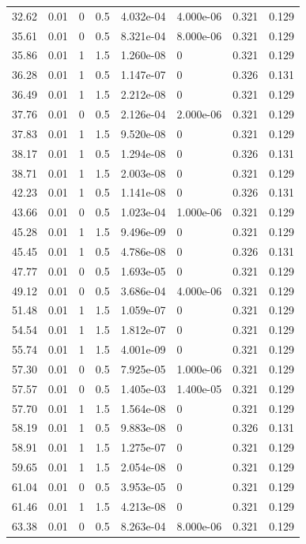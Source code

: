 \documentclass[preview]{standalone}
\begin{document}
{{\begin{tabular}{L{1.2cm}C{1.2cm} C{0.3cm}C{0.5cm} C{1.4cm}C{1.4cm} C{1.4cm}C{1.4cm}}
  32.62  &  0.01  & 0     & 0.5 &  4.032e-04  & 4.000e-06  & 0.321 &  0.129   \\ 
  35.61  &  0.01  & 0     & 0.5 &  8.321e-04  & 8.000e-06  & 0.321 &  0.129   \\ 
  35.86  &  0.01  & 1     & 1.5 &  1.260e-08  & 0  & 0.321 &  0.129   \\ 
  36.28  &  0.01  & 1     & 0.5 &  1.147e-07  & 0  & 0.326 &  0.131   \\ 
  36.49  &  0.01  & 1     & 1.5 &  2.212e-08  & 0  & 0.321 &  0.129   \\ 
  37.76  &  0.01  & 0     & 0.5 &  2.126e-04  & 2.000e-06  & 0.321 &  0.129   \\ 
  37.83  &  0.01  & 1     & 1.5 &  9.520e-08  & 0  & 0.321 &  0.129   \\ 
  38.17  &  0.01  & 1     & 0.5 &  1.294e-08  & 0  & 0.326 &  0.131   \\ 
  38.71  &  0.01  & 1     & 1.5 &  2.003e-08  & 0  & 0.321 &  0.129   \\ 
  42.23  &  0.01  & 1     & 0.5 &  1.141e-08  & 0  & 0.326 &  0.131   \\ 
  43.66  &  0.01  & 0     & 0.5 &  1.023e-04  & 1.000e-06  & 0.321 &  0.129   \\ 
  45.28  &  0.01  & 1     & 1.5 &  9.496e-09  & 0  & 0.321 &  0.129   \\ 
  45.45  &  0.01  & 1     & 0.5 &  4.786e-08  & 0  & 0.326 &  0.131   \\ 
  47.77  &  0.01  & 0     & 0.5 &  1.693e-05  & 0  & 0.321 &  0.129   \\ 
  49.12  &  0.01  & 0     & 0.5 &  3.686e-04  & 4.000e-06  & 0.321 &  0.129   \\ 
  51.48  &  0.01  & 1     & 1.5 &  1.059e-07  & 0  & 0.321 &  0.129   \\ 
  54.54  &  0.01  & 1     & 1.5 &  1.812e-07  & 0  & 0.321 &  0.129   \\ 
  55.74  &  0.01  & 1     & 1.5 &  4.001e-09  & 0  & 0.321 &  0.129   \\ 
  57.30  &  0.01  & 0     & 0.5 &  7.925e-05  & 1.000e-06  & 0.321 &  0.129   \\ 
  57.57  &  0.01  & 0     & 0.5 &  1.405e-03  & 1.400e-05  & 0.321 &  0.129   \\ 
  57.70  &  0.01  & 1     & 1.5 &  1.564e-08  & 0  & 0.321 &  0.129   \\ 
  58.19  &  0.01  & 1     & 0.5 &  9.883e-08  & 0  & 0.326 &  0.131   \\ 
  58.91  &  0.01  & 1     & 1.5 &  1.275e-07  & 0  & 0.321 &  0.129   \\ 
  59.65  &  0.01  & 1     & 1.5 &  2.054e-08  & 0  & 0.321 &  0.129   \\ 
  61.04  &  0.01  & 0     & 0.5 &  3.953e-05  & 0  & 0.321 &  0.129   \\ 
  61.46  &  0.01  & 1     & 1.5 &  4.213e-08  & 0  & 0.321 &  0.129   \\ 
  63.38  &  0.01  & 0     & 0.5 &  8.263e-04  & 8.000e-06  & 0.321 &  0.129   \\ 
\hline 
\end{tabular} 

}}
\end{document}
